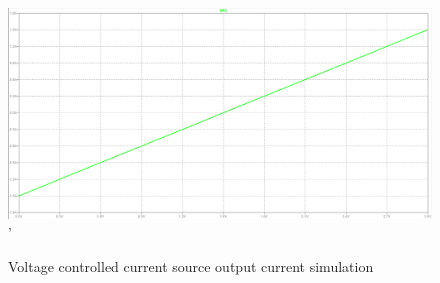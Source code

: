 \documentclass[10pt,twocolumn,letterpaper]{article}
\begin{document}
\begin{figure}[htb]
  \centering
  \includegraphics[width=\linewidth, keepaspectratio]{figures/current-source-output.png}'
  \caption{Voltage controlled current source output current simulation}
  \label{fig:sim-current-source-output-current}
\end{figure}
\end{document}
